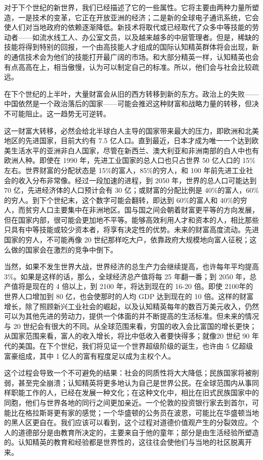 对于下个世纪的新世界，我们已经描述了它的一些属性。它将主要由两种力量所塑造，一是技术的变革，它正在开放亚洲的经济；二是新的全球电子通讯系统，它会使人们对当地政府的依赖逐渐降低。新技术将取代或已经取代了众多中等技能的劳动者——如流水线工人、办公室文员，以及越来越多的中层管理者。但是，稀缺的技能将得到特别的回报，一个由高技能人才组成的国际认知精英群体将会出现，新的通信技术会为他们的技能打开最广阔的市场。和大部分精英一样，认知精英也会有点高高在上，相当傲慢，认为可以制定自己的标准。所以，他们会与社会比较疏远。

在下个世纪的上半叶，大量财富会从旧的西方转移到新的东方。政治上的失败——中国依然是一个政治落后的国家——可能会推迟这种财富和战略力量的转移，但决不可能阻止。这一趋势无可逆转。

这一财富大转移，必然会给北半球白人主导的国家带来最大的压力，即欧洲和北美地区的先进国家，目前大约有 7.5 亿人口。直到最近，日本才成为唯一一个达到欧美生活水平的亚洲非白人国家，尽管在新西兰、澳大利亚和非洲南部的白人中也有欧洲人种。即使在 1990 年，先进工业国家的总人口也只占世界 50 亿人口的 15\%左右。世界财富的分配状态是 15\%的富人，85\%的穷人，和 100 年前先进工业社会的收入分布非常像。经过一段加速的进程，到 2050 年，世界的总人口可能达到 70 亿，先进经济体的人口预计会有 30 亿；或财富的分配比例是 40\%的富人，60\%的穷人。到下个世纪末，这个数字可能会翻转，即达到 60\%的富人和 40\%的穷人，而贫穷人口主要集中在非洲地区。国与国之间会朝着财富更平等的方向发展，但在国家内部，很可能会更加地不平等。能够高效利用人才和资本的人，相比那些只具有中等技能或较少资本者，将享有决定性的优势。未来的财富高度流动。先进国家的穷人，不可能再像 20 世纪那样吃大户，依靠政府大规模地向富人征税；这么做的国家会在激烈的竞争中倒下。

当然，如果不发生世界大战，世界经济的总生产力会继续提高，也许每年平均提高 3\%。如果是这样的话，那么，全球经济总产值将每 25 年翻一番；到 2050 年，总产值将是现在的 4 倍以上，到 2100 年，将达到现在的 16-20 倍。即使 2100年的世界人口增加到 80 亿，也会使那时的人均 GDP 达到现在的 10 倍。这样的财富增长，除了照顾新兴工业社会的崛起，以及认知精英每年的数百万美元收入，仍然可以为其他先进的劳动力，提供一个体面的并不断提高的生活标准。但未来的情况与 20 世纪会有很大的不同。从全球范围来看，穷国的收入会比富国的增长更快；从国家范围来看，富人的收入增长，将比中低收入者要快得多；就像20 世纪 90 年代的美国。在下个世纪，我们将见证一个世界超级阶级的诞生，也许由 5 亿超级富豪组成，其中 1 亿人的富有程度足以成为主权个人。

这个过程会导致一个不可避免的结果：社会的同质性将大大降低；民族国家将被削弱，甚至完全崩溃；认知精英将更多地认为自己是世界公民。在全球范围内从事同样职能工作的人，已经在发展一种文化；在这种文化中，相比在旧式民族国家中的同胞，他们与世界各地的同行之间更加亲近。一个伦敦的投资银行家去到首尔，可能比在格拉斯哥更有家的感觉；一个华盛顿的公务员在波恩，可能比在华盛顿当地的黑人区更自在。我们应该可以看到，这个过程对道德价值观产生的分裂效应。个人的道德部分是由教育所决定的，主要来自于他的童年；部分是由生活经验所塑造的。认知精英的教育和经验都是世界性的，这往往会使他们与当地的社区脱离开来。

